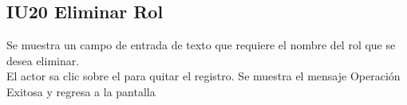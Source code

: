 \newpage
\subsection{IU20 Eliminar Rol}
	Se muestra un campo de entrada de texto que requiere el nombre del rol que se desea eliminar. \\
	El actor sa clic sobre el  para quitar el registro. Se
	 muestra el mensaje Operación Exitosa y regresa a la pantalla 
